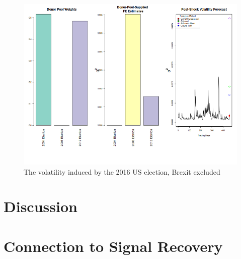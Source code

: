 \documentclass[11pt]{article}
\theoremstyle{definition}
\begin{document}
\begin{figure}[h!]
\begin{center}
  \includegraphics[scale=.6]{real_data_output_plots/savetime_FriOct2707:14:00PM2023_IYG_CL=F-^VIX-^IRX-^FVX-^TNX-^TYX_^VIX_2016-11-08-2004-11-02-2008-11-04-2012-11-06.png}
  \caption{The volatility induced by the 2016 US election, Brexit excluded}
  \label{fig:SVF_2016_without_Brexit}
  \end{center}
\end{figure}

\section{Discussion}


\section{Connection to Signal Recovery}
\end{document}
